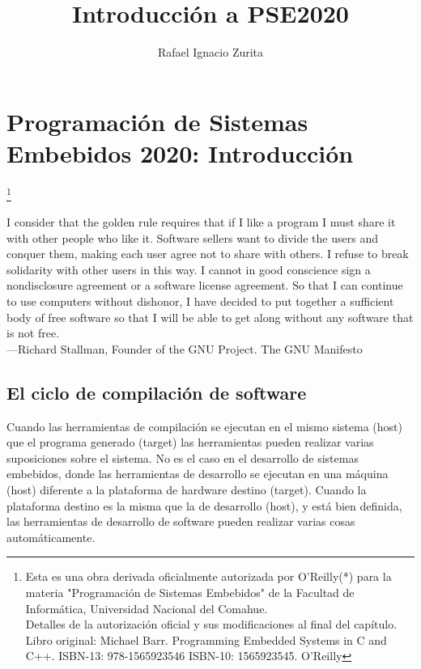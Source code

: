 \documentclass[output=paper, 
colorlinks,
citecolor=brown,
newtxmath
]{langscibook}
\author{Rafael Ignacio Zurita\affiliation{Universidad Nacional del Comahue}}
\title{Introducción a PSE2020}
\begin{document}

\chapterfont{\Large\color{LightBlue}} 
\chapter*{ Programación de Sistemas Embebidos 2020: Introducción}

\begingroup
\let\clearpage\relax
\cleardoublepage
\hypersetup{linkcolor=blue}
\tableofcontents*
\endgroup


\footnote{\scriptsize\normalfont Esta es una obra derivada oficialmente autorizada por O'Reilly(*) para la materia "Programación de Sistemas Embebidos" de la Facultad de Informática, Universidad Nacional del Comahue. \\ Detalles de la autorización oficial y sus modificaciones al final del capítulo. \\ Libro original: Michael Barr. Programming Embedded Systems in C and C++. ISBN-13: 978-1565923546
ISBN-10: 1565923545. O'Reilly }

{\def\addcontentsline#1#2#3{}\maketitle}




\hfill\begin{minipage}{0.8\linewidth} \footnotesize
I consider that the golden rule requires that if I like a program I 
must share it with other people who like it. 
Software sellers want to divide the users and conquer them, making 
each user agree not to share with others. I refuse to break solidarity 
with other users in this way. I cannot in good conscience sign a
nondisclosure agreement or a software license agreement. 
So that I can continue to use computers
without dishonor, I have decided to put together a sufficient body of free software so that I will be able
to get along without any software that is not free.\\
—Richard Stallman, Founder of the GNU Project. The GNU Manifesto
\end{minipage}


\section {El ciclo de compilación de software}


Cuando las herramientas de compilación se ejecutan en el mismo sistema (host)
que el programa generado (target) las herramientas pueden realizar
varias suposiciones sobre el sistema.
No es el caso en el desarrollo de sistemas embebidos, donde las herramientas
de desarrollo se ejecutan en una máquina (host) diferente a la plataforma
de hardware destino (target).
Cuando la plataforma destino es la misma que la de desarrollo (host), y está
bien definida, las herramientas de
desarrollo de software pueden realizar varias cosas automáticamente.
 
\end{document}
